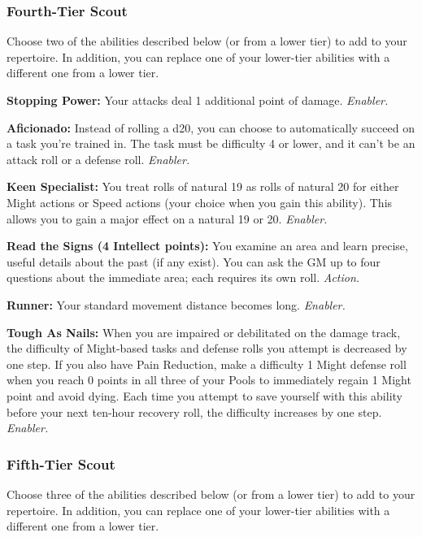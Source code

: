 \documentclass[a4paper,10pt,final,twocolumn,oneside]{book}
\newcommand{\itemAbility}[2]{\textcolor{25gray}{\textbullet\textbf{ #1:}}{ #2}\par}
\newcommand{\enabler}{\textit{ Enabler.}}
\newcommand{\action}{\textit{ Action.}}
\begin{document}
\subsubsection*{Fourth-Tier Scout}
\label{subsub:scoutFourthTier}

Choose two of the abilities described
below (or from a lower tier) to add to your
repertoire. In addition, you can replace one
of your lower-tier abilities with a different
one from a lower tier.

\itemAbility{Stopping Power}{Your attacks deal 1 additional point of damage.\enabler}

\itemAbility{Aficionado}{Instead of rolling a d20, you can choose to automatically succeed on a task you’re trained in. The task must be difficulty 4 or lower, and it can’t be an attack roll or a defense roll.\enabler}

\itemAbility{Keen Specialist}{You treat rolls of natural 19 as rolls of natural 20 for either Might actions or Speed actions (your choice when you gain this ability). This allows you to gain a major effect on a natural 19 or 20.\enabler}

\itemAbility{Read the Signs (4 Intellect points)}{You examine an area and learn precise, useful details about the past (if any exist). You can ask the GM up to four questions about the immediate area; each requires its own roll.\action}

\itemAbility{Runner}{Your standard movement distance becomes long.\enabler}

\itemAbility{Tough As Nails}{When you are impaired or debilitated on the damage track, the difficulty of Might-based tasks and defense rolls you attempt is decreased by one step. If you also have Pain Reduction, make a difficulty 1 Might defense roll when you reach 0 points in all three of your Pools to immediately regain 1 Might point and avoid dying. Each time you attempt to save yourself with this ability before your next ten-hour recovery roll, the difficulty increases by one step.\enabler}


\subsubsection*{Fifth-Tier Scout}
\label{subsub:scoutFifthTier}

Choose three of the abilities described below (or from a lower tier) to add to your repertoire. In addition, you can replace one of your lower-tier abilities with a different one from a lower tier.
\end{document}
